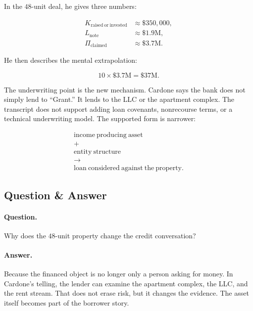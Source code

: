 \documentclass[11pt,oneside]{book}
\begin{document}
In the \(48\)-unit deal, he gives three numbers:

\begin{align}
K_{\mathrm{raised\ or\ invested}} &\approx \$350{,}000,\\
L_{\mathrm{note}} &\approx \$1.9\mathrm{M},\\
\Pi_{\mathrm{claimed}} &\approx \$3.7\mathrm{M}.
\end{align}

He then describes the mental extrapolation:

\begin{equation}
10\times \$3.7\mathrm{M}
=
\$37\mathrm{M}.
\end{equation}

The underwriting point is the new mechanism. Cardone says the bank does not simply lend to ``Grant.'' It lends to the LLC or the apartment complex. The transcript does not support adding loan covenants, nonrecourse terms, or a technical underwriting model. The supported form is narrower:

\begin{equation}
\begin{gathered}
\mathrm{income\ producing\ asset}\\
+\\
\mathrm{entity\ structure}\\
\longrightarrow\\
\mathrm{loan\ considered\ against\ the\ property}.
\end{gathered}
\end{equation}

\subsection{Question \& Answer}

\paragraph{Question.}
Why does the \(48\)-unit property change the credit conversation?

\paragraph{Answer.}
Because the financed object is no longer only a person asking for money. In Cardone's telling, the lender can examine the apartment complex, the LLC, and the rent stream. That does not erase risk, but it changes the evidence. The asset itself becomes part of the borrower story.
\end{document}
